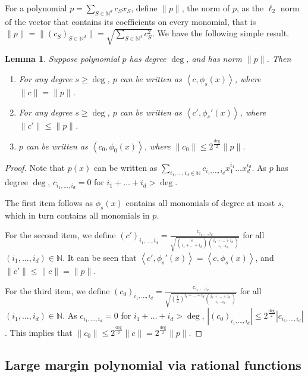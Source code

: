 \documentclass{article}
\newcommand{\field}[1]{\mathbb{#1}}
\newcommand{\fN}{\field{N}}
\newcommand{\inner}[1]{ \left\langle {#1} \right\rangle }
\newtheorem{lemma}[theorem]{Lemma}
\begin{document}
For a polynomial $p = \sum_{S \in \fN^d} c_S x_S$, define $\|p\|$, the norm of $p$, as the $\ell_2$ norm of the vector that contains its coefficients on every monomial, that is $\|p\| = \| (c_S)_{S \in \fN^d} \| = \sqrt{\sum_{S \in \fN^d} c_S^2}$. We have the following simple result.
\begin{lemma}
Suppose polynomial $p$ has degree $\deg$, and has norm $\|p\|$. Then
\begin{enumerate}
\item For any degree $s \geq \deg$, $p$ can be written as $\inner{c, \phi_s(x)}$, where $\|c\| = \|p\|$.
\item For any degree $s \geq \deg$, $p$ can be written as $\inner{c', \phi_s'(x)}$, where $\|c'\| \leq \|p\|$.
\item $p$ can be written as $\inner{c_0, \phi_0(x)}$, where $\|c_0\| \leq 2^{\frac{\deg}{2}} \|p\|$.
\end{enumerate}
\end{lemma}
\label{lem:fm-convert}
\begin{proof}
Note that $p(x)$ can be written as $\sum_{i_1,\ldots,i_d \in \fN} c_{i_1,\ldots,i_d} x_1^{i_1} \ldots x_d^{i_d}$. As $p$ has degree $\deg$, $c_{i_1,\ldots,i_d} = 0$ for $i_1 + \ldots + i_d > \deg$.

The first item follows as $\phi_s(x)$ contains all monomials of degree at most $s$, which in turn contains all monomials in $p$.

For the second item, we define $(c')_{i_1,\ldots,i_d} = \frac{c_{i_1,\ldots,i_d}}{\sqrt{ {s \choose i_1+\ldots+i_d} {i_1+\ldots+i_d \choose i_1 \ldots i_d}}}$ for all $(i_1,\ldots,i_d) \in \fN$. It can be seen that $\inner{c', \phi_s'(x)} = \inner{c, \phi_s(x)}$, and
$\| c' \| \leq \| c \| = \| p \|$.

For the third item, we define $(c_0)_{i_1,\ldots,i_d} = \frac{c_{i_1,\ldots,i_d}}{\sqrt{ (\frac 1 2)^{i_1+\ldots+i_d} {i_1+\ldots+i_d \choose i_1 \ldots i_d}}}$ for all $(i_1,\ldots,i_d) \in \fN$. As $c_{i_1,\ldots,i_d} = 0$ for $i_1 + \ldots + i_d > \deg$, $|(c_0)_{i_1,\ldots,i_d}| \leq 2^{\frac{\deg}{2}} |c_{i_1,\ldots,i_d}|$.
This implies that
$\| c_0 \| \leq 2^{\frac{\deg}{2}} \| c \| = 2^{\frac{\deg}{2}} \| p \| $.
\end{proof}




\subsection{Large margin polynomial via rational functions}
\end{document}

